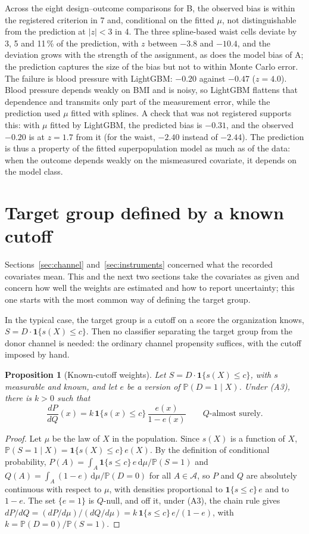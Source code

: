 \documentclass[11pt,a4paper]{article}
\newcommand{\PP}{\mathbb{P}}
\newcommand{\ind}{\mathbf{1}}
\newcommand{\A}{\mathcal{A}}
\newcommand{\dd}{\,\mathrm{d}}
\theoremstyle{plain}
\newtheorem{proposition}{Proposition}
\theoremstyle{definition}
\begin{document}
Across the eight design--outcome comparisons for B, the observed bias is within the registered criterion in 7 and, conditional on the fitted $\mu$, not distinguishable from the prediction at $|z|<3$ in 4. The three spline-based waist cells deviate by 3, 5 and 11\,\% of the prediction, with $z$ between $-3.8$ and $-10.4$, and the deviation grows with the strength of the assignment, as does the model bias of A; the prediction captures the size of the bias but not to within Monte Carlo error. The failure is blood pressure with LightGBM: $-0.20$ against $-0.47$ ($z=4.0$). Blood pressure depends weakly on BMI and is noisy, so LightGBM flattens that dependence and transmits only part of the measurement error, while the prediction used $\mu$ fitted with splines. A check that was not registered supports this: with $\mu$ fitted by LightGBM, the predicted bias is $-0.31$, and the observed $-0.20$ is at $z=1.7$ from it (for the waist, $-2.40$ instead of $-2.44$). The prediction is thus a property of the fitted superpopulation model as much as of the data: when the outcome depends weakly on the mismeasured covariate, it depends on the model class.
\section{Target group defined by a known cutoff}\label{sec:cutoff}

Sections~\ref{sec:channel} and~\ref{sec:instruments} concerned what the recorded covariates mean. This and the next two sections take the covariates as given and concern how well the weights are estimated and how to report uncertainty; this one starts with the most common way of defining the target group.

In the typical case, the target group is a cutoff on a score the organization knows, $S=D\cdot\ind\{s(X)\le c\}$. Then no classifier separating the target group from the donor channel is needed: the ordinary channel propensity suffices, with the cutoff imposed by hand.

\begin{proposition}[Known-cutoff weights]\label{prop:cutoff}
Let $S=D\cdot\ind\{s(X)\le c\}$, with $s$ measurable and known, and let $e$ be a version of $\PP(D=1\mid X)$. Under (A3), there is $k>0$ such that
\[
\frac{dP}{dQ}(x)=k\,\ind\{s(x)\le c\}\,\frac{e(x)}{1-e(x)}\qquad Q\text{-almost surely.}
\]
\end{proposition}
\begin{proof}
Let $\mu$ be the law of $X$ in the population. Since $s(X)$ is a function of $X$, $\PP(S=1\mid X)=\ind\{s(X)\le c\}\,e(X)$. By the definition of conditional probability, $P(A)=\int_A\ind\{s\le c\}\,e\dd\mu/\PP(S=1)$ and $Q(A)=\int_A(1-e)\dd\mu/\PP(D=0)$ for all $A\in\A$, so $P$ and $Q$ are absolutely continuous with respect to $\mu$, with densities proportional to $\ind\{s\le c\}\,e$ and to $1-e$. The set $\{e=1\}$ is $Q$-null, and off it, under (A3), the chain rule gives $dP/dQ=(dP/d\mu)/(dQ/d\mu)=k\,\ind\{s\le c\}\,e/(1-e)$, with $k=\PP(D=0)/\PP(S=1)$.
\end{proof}
\end{document}
